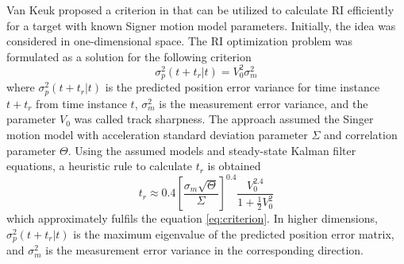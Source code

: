 \documentclass[english, 12pt, a4paper, elec, utf8, a-1b, online]{aaltothesis}
\begin{document}
Van Keuk proposed a criterion in \cite{Keuk1975} that can be utilized to calculate RI efficiently for a target with known Signer motion model \cite{RongLi2003} parameters.
Initially, the idea was considered in one-dimensional space.
The RI optimization problem was formulated as a solution for the following criterion
\begin{equation} \label{eq:criterion}
    \sigma_p^2(t + t_r | t) = V_0^2 \sigma_m^2
\end{equation}
where $\sigma_p^2(t + t_r | t)$ is the predicted position error variance for time instance $t+t_r$ from time instance $t$, $\sigma_m^2$ is the measurement error variance, and
the parameter $V_0$ was called track sharpness.
The approach assumed the Singer motion model with acceleration standard deviation parameter $\Sigma$ and correlation parameter $\Theta$.
Using the assumed models and steady-state Kalman filter equations, a heuristic rule to calculate $t_r$ is obtained
\begin{equation}\label{eq:keuk_time}
    t_r \approx 0.4 \left[ \frac{\sigma_m \sqrt{\Theta}}{\Sigma} \right]^{0.4} \frac{V_0^{2.4}}{1+\frac{1}{2}V_0^2}
\end{equation}
which approximately fulfils the equation \eqref{eq:criterion}.
In higher dimensions, $\sigma_p^2(t + t_r | t)$ is the maximum eigenvalue of the predicted position error matrix, and $\sigma_m^2$ is the measurement error variance in the corresponding direction.
\end{document}

